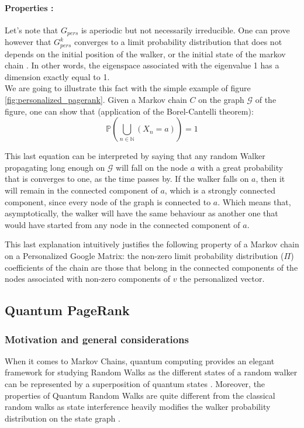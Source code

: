 \documentclass{article}
\begin{document}
\paragraph{Properties :} 
Let's note that $G_{pers}$ is aperiodic but not necessarily irreducible. One can prove however that $G_{pers}^k$ converges to a limit probability distribution that does not depends on the initial position of the walker, or the initial state of the markov chain \cite{gleich_2015}. In other words, the eigenspace associated with the eigenvalue 1 has a dimension exactly equal to 1.  \\
We are going to illustrate this fact with the simple example of figure \ref{fig:personalized_pagerank}. Given a Markov chain $C$ on the graph $\mathcal{G}$ of the figure, one can show that (application of the Borel-Cantelli theorem):  
\begin{equation}
    \mathbb{P}(\underset{n\in \mathbb{N}}{\bigcup}(X_n = a)) = 1
\end{equation}

This last equation can be interpreted by saying that any random Walker propagating long enough on $\mathcal{G}$ will fall on the node $a$ with a great probability that is converges to one, as the time passes by. If the walker falls on $a$, then it will remain in the connected component of $a$, which is a strongly connected component, since every node of the graph is connected to $a$. Which means that, asymptotically, the walker will have the same behaviour as another one that would have started from any node in the connected component of $a$.

This last explanation intuitively justifies the following property of a Markov chain on a Personalized Google Matrix: the non-zero limit probability distribution ($\Pi$) coefficients of the chain are those that belong in the connected components of the nodes associated with non-zero components of $v$ the personalized vector.  

\subsection{Quantum PageRank}

\subsubsection{Motivation and general considerations}

When it comes to Markov Chains, quantum computing provides an elegant framework for studying Random Walks as the different states of a random walker can be represented by a superposition of quantum states \cite{loke_tang_rodriguez_small_wang_2016}. Moreover, the properties of Quantum Random Walks are quite different from the classical random walks as state interference heavily modifies the walker probability distribution on the state graph \cite{kempe_2009}.
\end{document}
